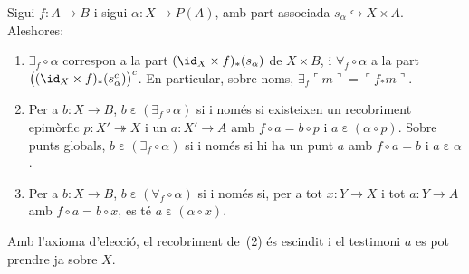 \begin{proposicio}\label{prop:quantificadors-lectura}
Sigui \(f\colon A\to B\) i sigui \(\alpha\colon X\to P(A)\), amb part
associada \(s_\alpha\hookrightarrow X\times A\). Aleshores:
\begin{enumerate}
\item \(\exists_f\circ\alpha\) correspon a la part
\((\id_X\times f)_{*}(s_\alpha)\) de \(X\times B\), i
\(\forall_f\circ\alpha\) a la part
\(\bigl((\id_X\times f)_{*}(s_\alpha^{c})\bigr)^{c}\). En particular, sobre
noms, \(\exists_f\ulcorner m\urcorner=\ulcorner f_*m\urcorner\).
\item Per a \(b\colon X\to B\), \(b\mathrel{\varepsilon}(\exists_f\circ\alpha)\)
si i només si existeixen un recobriment epimòrfic
\(p\colon X'\twoheadrightarrow X\) i un \(a\colon X'\to A\) amb
\(f\circ a=b\circ p\) i \(a\mathrel{\varepsilon}(\alpha\circ p)\). Sobre
punts globals, \(b\mathrel{\varepsilon}(\exists_f\circ\alpha)\) si i només
si hi ha un punt \(a\) amb \(f\circ a=b\) i \(a\mathrel{\varepsilon}\alpha\).
\item Per a \(b\colon X\to B\), \(b\mathrel{\varepsilon}(\forall_f\circ\alpha)\)
si i només si, per a tot \(x\colon Y\to X\) i tot \(a\colon Y\to A\) amb
\(f\circ a=b\circ x\), es té \(a\mathrel{\varepsilon}(\alpha\circ x)\).
\end{enumerate}
Amb l'axioma d'elecció, el recobriment de~(2) és escindit i el testimoni
\(a\) es pot prendre ja sobre \(X\).
\end{proposicio}

